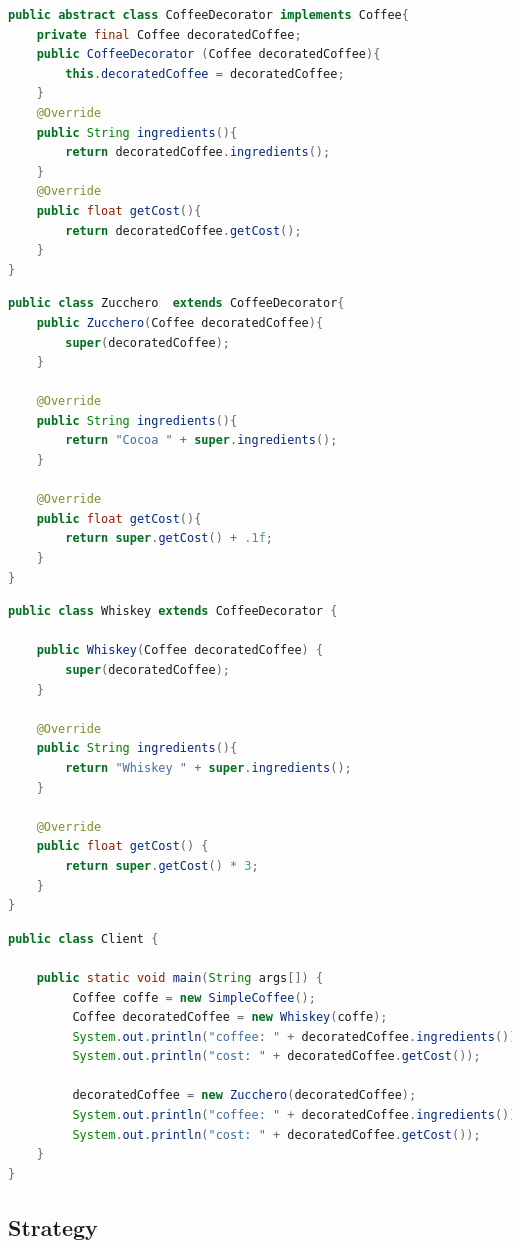 \documentclass{article}
\begin{document}
\begin{lstlisting}[language=Java]
public abstract class CoffeeDecorator implements Coffee{
	private final Coffee decoratedCoffee;
	public CoffeeDecorator (Coffee decoratedCoffee){
		this.decoratedCoffee = decoratedCoffee;
	}
	@Override
	public String ingredients(){
		return decoratedCoffee.ingredients();
	}
	@Override
	public float getCost(){
		return decoratedCoffee.getCost();
	}
}
\end{lstlisting}

\begin{lstlisting}[language=Java]
public class Zucchero  extends CoffeeDecorator{
	public Zucchero(Coffee decoratedCoffee){
		super(decoratedCoffee);
	}
	
	@Override
	public String ingredients(){
		return "Cocoa " + super.ingredients();
	}
	
	@Override
	public float getCost(){
		return super.getCost() + .1f;
	}
}
\end{lstlisting}

\begin{lstlisting}[language=Java]
public class Whiskey extends CoffeeDecorator {

	public Whiskey(Coffee decoratedCoffee) {
		super(decoratedCoffee);	
	}	
	
	@Override
	public String ingredients(){
		return "Whiskey " + super.ingredients();
	}
	
	@Override
	public float getCost() {
		return super.getCost() * 3;
	}
}
\end{lstlisting}

\begin{lstlisting}[language=Java]
public class Client {
	
	public static void main(String args[]) {
	     Coffee coffe = new SimpleCoffee();
	     Coffee decoratedCoffee = new Whiskey(coffe);
	     System.out.println("coffee: " + decoratedCoffee.ingredients());
	     System.out.println("cost: " + decoratedCoffee.getCost());  
	     
	     decoratedCoffee = new Zucchero(decoratedCoffee);
	     System.out.println("coffee: " + decoratedCoffee.ingredients());
	     System.out.println("cost: " + decoratedCoffee.getCost());  
	}	
}
\end{lstlisting}

\subsection{Strategy}
\end{document}
